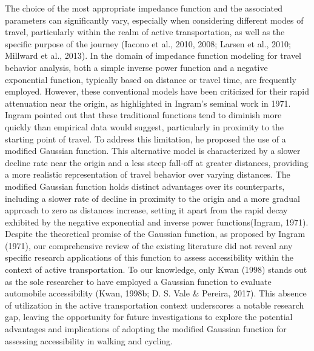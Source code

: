\documentclass[12pt,twoside]{reedthesis}
\begin{document}
The choice of the most appropriate impedance function and the associated parameters can significantly vary, especially when considering different modes of travel, particularly within the realm of active transportation, as well as the specific purpose of the journey (Iacono et al., 2010, 2008; Larsen et al., 2010; Millward et al., 2013). In the domain of impedance function modeling for travel behavior analysis, both a simple inverse power function and a negative exponential function, typically based on distance or travel time, are frequently employed. However, these conventional models have been criticized for their rapid attenuation near the origin, as highlighted in Ingram's seminal work in 1971. Ingram pointed out that these traditional functions tend to diminish more quickly than empirical data would suggest, particularly in proximity to the starting point of travel. To address this limitation, he proposed the use of a modified Gaussian function. This alternative model is characterized by a slower decline rate near the origin and a less steep fall-off at greater distances, providing a more realistic representation of travel behavior over varying distances. The modified Gaussian function holds distinct advantages over its counterparts, including a slower rate of decline in proximity to the origin and a more gradual approach to zero as distances increase, setting it apart from the rapid decay exhibited by the negative exponential and inverse power functions(Ingram, 1971). Despite the theoretical promise of the Gaussian function, as proposed by Ingram (1971), our comprehensive review of the existing literature did not reveal any specific research applications of this function to assess accessibility within the context of active transportation. To our knowledge, only Kwan (1998) stands out as the sole researcher to have employed a Gaussian function to evaluate automobile accessibility (Kwan, 1998b; D. S. Vale \& Pereira, 2017). This absence of utilization in the active transportation context underscores a notable research gap, leaving the opportunity for future investigations to explore the potential advantages and implications of adopting the modified Gaussian function for assessing accessibility in walking and cycling.
\end{document}
